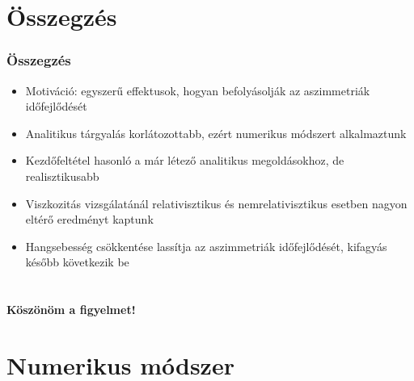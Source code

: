 \documentclass{beamer}
\begin{document}
\section{Összegzés}
\begin{frame}
\frametitle{Összegzés}
\begin{itemize}
\setlength{\itemsep}{16pt}
\item<1-> Motiváció: egyszerű effektusok, hogyan befolyásolják az aszimmetriák időfejlődését
\item<1-> Analitikus tárgyalás korlátozottabb, ezért numerikus módszert alkalmaztunk
\item<2-> Kezdőfeltétel hasonló a már létező analitikus megoldásokhoz, de realisztikusabb
\item<3-> Viszkozitás vizsgálatánál relativisztikus és nemrelativisztikus esetben nagyon eltérő eredményt kaptunk
\item<4-> Hangsebesség csökkentése lassítja az aszimmetriák időfejlődését, kifagyás később következik be
\end{itemize}
\end{frame}

\section{}
\begin{frame}[noframenumbering]
\begin{center}
\textbf{\huge{Köszönöm a figyelmet!}}
\end{center}
\end{frame}











\section{Numerikus módszer}
\end{document}
